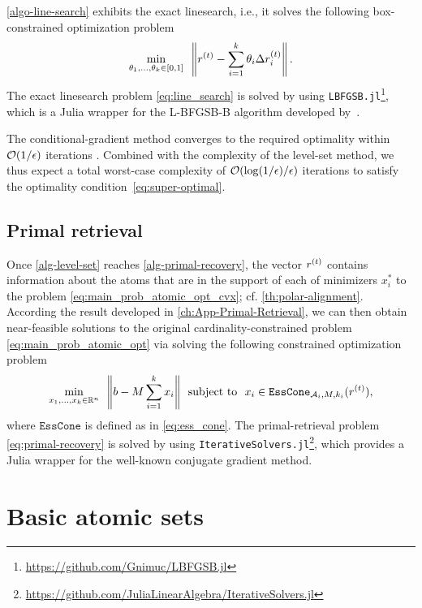 \autoref{algo-line-search} exhibits the exact linesearch, i.e., it solves the following box-constrained optimization problem
\begin{equation} \label{eq:line_search}
  \min_{\theta_1, \dots, \theta_k \in [0,1]} \enspace \left\|r^{(t)} - \sum_{i=1}^k \theta_i\Delta r_i^{(t)}\right\|.
\end{equation}
The exact linesearch problem \eqref{eq:line_search} is solved by using \texttt{LBFGSB.jl}\footnote{\url{https://github.com/Gnimuc/LBFGSB.jl}}, which is a Julia wrapper for the L-BFGSB-B algorithm developed by~\citet{zhu1997algorithm}. 

The conditional-gradient method converges to the required optimality within $\mathcal{O}(1/\epsilon)$ iterations \cite{jaggi2013revisiting}. Combined with the complexity of the level-set method, we thus expect a total worst-case complexity of $\mathcal{O}(\log(1/\epsilon)/\epsilon)$ iterations to satisfy the optimality condition~\eqref{eq:super-optimal}.

\subsection{Primal retrieval} \label{sec:primal_retrieval}
Once \autoref{alg-level-set} reaches \autoref{alg-primal-recovery}, the vector $r^{(t)}$ contains information about the atoms that are in the support of each of minimizers $x_i^*$ to the problem \eqref{eq:main_prob_atomic_opt_cvx}; cf. \autoref{th:polar-alignment}. According the result developed in \autoref{ch:App-Primal-Retrieval}, we can then obtain near-feasible solutions to the original cardinality-constrained problem \eqref{eq:main_prob_atomic_opt} via solving the following constrained optimization problem
\begin{equation} \label{eq:primal-recovery}
  \min_{x_1, \dots, x_k \in \mathbb{R}^n} \enspace \left\|b - M\sum_{i=1}^k x_i\right\| \enspace\mathop{\hbox{\rm subject to}}\enspace x_i \in \texttt{EssCone}_{\mathcal{A}_i, M, k_i}(r^{(t)}),
\end{equation}
where $\texttt{EssCone}$ is defined as in \eqref{eq:ess_cone}. The primal-retrieval problem \eqref{eq:primal-recovery} is solved by using \texttt{IterativeSolvers.jl}\footnote{\url{https://github.com/JuliaLinearAlgebra/IterativeSolvers.jl}}, which provides a Julia wrapper for the well-known conjugate gradient method.  



\section{Basic atomic sets} \label{sec:5-3}

